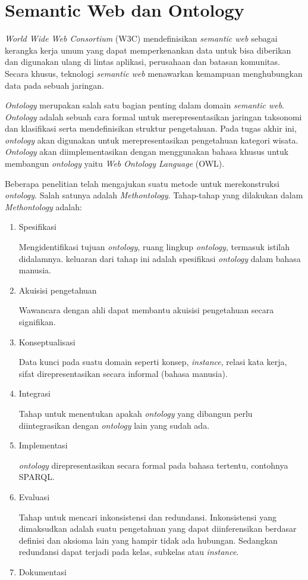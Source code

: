 \section{Semantic Web dan Ontology}

\textit{World Wide Web Consortium} (W3C) mendefinisikan \textit{semantic web} sebagai kerangka kerja umum yang dapat memperkenankan data untuk bisa diberikan dan digunakan ulang di lintas aplikasi, perusahaan dan batasan komunitas. Secara khusus, teknologi \textit{semantic web} menawarkan kemampuan menghubungkan data pada sebuah jaringan.
\par
\textit{Ontology} merupakan salah satu bagian penting dalam domain \textit{semantic web}. \textit{Ontology} adalah sebuah cara formal untuk merepresentasikan jaringan taksonomi dan klasifikasi serta mendefinisikan struktur pengetahuan. Pada tugas akhir ini, \textit{ontology} akan digunakan untuk merepresentasikan pengetahuan kategori wisata. \textit{Ontology} akan diimplementasikan dengan menggunakan bahasa khusus untuk membangun \textit{ontology} yaitu \textit{Web Ontology Language} (OWL).
\par
Beberapa penelitian telah mengajukan suatu metode untuk merekonstruksi \textit{ontology}. Salah satunya adalah \textit{Methontology}\cite{jones1998methodologies}. Tahap-tahap yang dilakukan dalam \textit{Methontology} adalah:
\begin{enumerate}
	\item Spesifikasi \par Mengidentifikasi tujuan \textit{ontology}, ruang lingkup \textit{ontology}, termasuk istilah didalamnya. keluaran dari tahap ini adalah spesifikasi \textit{ontology} dalam bahasa manusia.
	\item Akuisisi pengetahuan \par Wawancara dengan ahli dapat membantu akuisisi pengetahuan secara signifikan.
	\item Konseptualisasi  \par Data kunci pada suatu domain seperti konsep, \textit{instance}, relasi kata kerja, sifat direpresentasikan secara informal (bahasa manusia).
	\item Integrasi  \par Tahap untuk menentukan apakah \textit{ontology} yang dibangun perlu diintegrasikan dengan \textit{ontology} lain yang sudah ada.
	\item Implementasi \par \textit{ontology} direpresentasikan secara formal pada bahasa tertentu, contohnya SPARQL. 
	\item Evaluasi \par Tahap untuk mencari inkonsistensi dan redundansi. Inkonsistensi yang dimaksudkan adalah suatu pengetahuan yang dapat diinferensikan berdasar definisi dan aksioma lain yang hampir tidak ada hubungan. Sedangkan redundansi dapat terjadi pada kelas, subkelas atau \textit{instance}.
	\item Dokumentasi
\end{enumerate}


